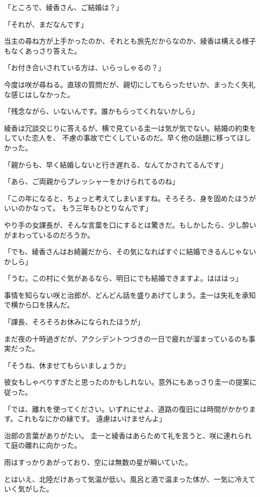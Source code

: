 ﻿\documentclass[book,tate]{jlreq}
\begin{document}
「ところで、綾香さん、ご結婚は？」

「それが、まだなんです」

当主の尋ね方が上手かったのか、それとも旅先だからなのか、綾香は構える様子もなくあっさり答えた。

「お付き合いされている方は、いらっしゃるの？」

今度は咲が尋ねる。直球の質問だが、親切にしてもらったせいか、まったく失礼な感じはしなかった。

「残念ながら、いないんです。誰かもらってくれないかしら」

綾香は冗談交じりに答えるが、横で見ている圭一は気が気でない。結婚の約束をしていた恋人を、
不慮の事故で亡くしているのだ。早く他の話題に移ってほしかった。

「親からも、早く結婚しないと行き遅れる、なんてかされてるんです」

「あら、ご両親からプレッシャーをかけられてるのね」

「この年になると、ちょっと考えてしまいますね。そろそろ、身を固めたほうがいいのかなって。
もう三年もひとりなんです」

やり手の女課長が、そんな言葉を口にするとは驚きだ。もしかしたら、少し酔いがまわっているのだろうか。

「でも、綾香さんはお綺麗だから、その気になればすぐに結婚できるんじゃないかしら」

「うむ。この村にぐ気があるなら、明日にでも結婚できますよ。はははっ」

事情を知らない咲と治郎が、どんどん話を盛りあげてしまう。圭一は失礼を承知で横から口を挟んだ。

「課長、そろそろお休みになられたほうが」

まだ夜の十時過ぎだが、アクシデントつづきの一日で疲れが溜まっているのも事実だった。

「そうね、休ませてもらいましょうか」

彼女もしゃべりすぎたと思ったのかもしれない。意外にもあっさり圭一の提案に従った。

「では、離れを使ってください。いずれにせよ、道路の復旧には時間がかかります。これもなにかの縁です。
遠慮はいけませんよ」

治郎の言葉がありがたい。 圭一と綾香はあらためて礼を言うと、咲に連れられて庭の離れに向かった。

雨はすっかりあがっており、空には無数の星が瞬いていた。

とはいえ、北陸だけあって気温が低い。風呂と酒で温まった体が、一気に冷えていく気がした。
\end{document}

